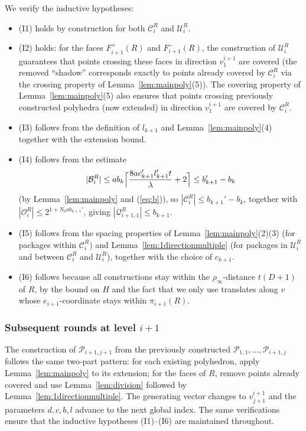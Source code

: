 \documentclass[10pt,a4paper]{amsart}
\begin{document}
We verify the inductive hypotheses:
\begin{itemize}
\item (I1) holds by construction for both $\mathcal{C}_i^R$ and
$\mathcal{U}_i^R$.
\item (I2) holds: for the faces $F_{i+1}^+(R)$ and $F_{i+1}^-(R)$, the
construction of $\mathcal{U}_i^R$ guarantees that points crossing these
faces in direction $v_1^{i+1}$ are covered (the removed ``shadow''
corresponds exactly to points already covered by $\mathcal{C}_i^R$ via the
crossing property of Lemma~\ref{lem:mainpoly}(5)). The covering property
of Lemma~\ref{lem:mainpoly}(5) also ensures that points crossing previously
constructed polyhedra (now extended) in direction $v_1^{i+1}$ are covered
by $\mathcal{C}_i^R$.
\item (I3) follows from the definition of $l_{k+1}$ and
Lemma~\ref{lem:mainpoly}(4) together with the extension bound.
\item (I4) follows from the estimate
\[
|\mathcal{B}_i^R| \leq a b_k
\Bigl\lceil \frac{8a c_{k+1}' l_{k+1}' t}{\lambda}+2 \Bigr\rceil
\leq b_{k+1}'-b_k
\]
(by Lemma~\ref{lem:mainpoly} and (\ref{eq:b})), so
$|\mathcal{C}_i^R| \leq b_{k+1}'-b_k$, together with
$|\mathcal{O}_i^R|\leq 2^{1+N_0ab_{k+1}'}$, giving
$|\mathcal{Q}_{i+1,1}^R|\leq b_{k+1}$.
\item (I5) follows from the spacing properties of
Lemma~\ref{lem:mainpoly}(2)(3) (for packages within $\mathcal{C}_i^R$) and
Lemma~\ref{lem:1directionmultiple} (for packages in $\mathcal{U}_i^R$ and
between $\mathcal{C}_i^R$ and $\mathcal{U}_i^R$), together with the choice
of $c_{k+1}$.
\item (I6) follows because all constructions stay within the
$\rho_\infty$-distance $t(D+1)$ of $R$, by the bound on $H$ and the fact
that we only use translates along $v$ whose $e_{i+1}$-coordinate stays
within $\pi_{i+1}(R)$.
\end{itemize}

\subsubsection{Subsequent rounds at level $i+1$}

The construction of $\mathcal{P}_{i+1,j+1}$ from the previously
constructed $\mathcal{P}_{1,1},\dots,\mathcal{P}_{i+1,j}$ follows the
same two-part pattern: for each existing polyhedron, apply
Lemma~\ref{lem:mainpoly} to its extension; for the faces of $R$, remove
points already covered and use Lemma~\ref{lem:division} followed by
Lemma~\ref{lem:1directionmultiple}. The generating vector changes to
$v_{j+1}^{i+1}$ and the parameters $d, c, b, l$ advance to the next
global index. The same verifications ensure that the inductive hypotheses
(I1)--(I6) are maintained throughout.
\end{document}
